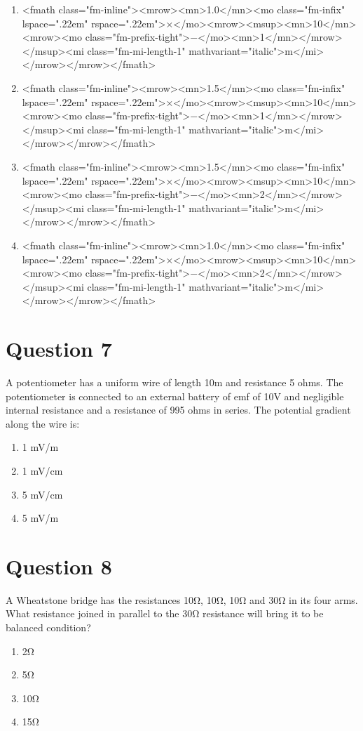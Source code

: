 \documentclass{article}
\begin{document}
\begin{enumerate}[label=(\alph*)]
\item  <fmath class="fm-inline"><mrow><mn>1.0</mn><mo class="fm-infix" lspace=".22em" rspace=".22em">×</mo><mrow><msup><mn>10</mn><mrow><mo class="fm-prefix-tight">−</mo><mn>1</mn></mrow></msup><mi class="fm-mi-length-1" mathvariant="italic">m</mi></mrow></mrow></fmath> 
\item  <fmath class="fm-inline"><mrow><mn>1.5</mn><mo class="fm-infix" lspace=".22em" rspace=".22em">×</mo><mrow><msup><mn>10</mn><mrow><mo class="fm-prefix-tight">−</mo><mn>1</mn></mrow></msup><mi class="fm-mi-length-1" mathvariant="italic">m</mi></mrow></mrow></fmath> 
\item  <fmath class="fm-inline"><mrow><mn>1.5</mn><mo class="fm-infix" lspace=".22em" rspace=".22em">×</mo><mrow><msup><mn>10</mn><mrow><mo class="fm-prefix-tight">−</mo><mn>2</mn></mrow></msup><mi class="fm-mi-length-1" mathvariant="italic">m</mi></mrow></mrow></fmath> 
\item  <fmath class="fm-inline"><mrow><mn>1.0</mn><mo class="fm-infix" lspace=".22em" rspace=".22em">×</mo><mrow><msup><mn>10</mn><mrow><mo class="fm-prefix-tight">−</mo><mn>2</mn></mrow></msup><mi class="fm-mi-length-1" mathvariant="italic">m</mi></mrow></mrow></fmath> 
\end{enumerate}
\newpage
\section*{Question 7}
A potentiometer has a uniform wire of length 10m and resistance 5 ohms. The potentiometer is connected to an external battery of emf of 10V and negligible internal resistance and a resistance of 995 ohms in series. The potential gradient along the wire is:
\begin{enumerate}[label=(\alph*)]
\item 1 mV/m
\item 1 mV/cm
\item 5 mV/cm
\item 5 mV/m
\end{enumerate}
\newpage
\section*{Question 8}
A Wheatstone bridge has the resistances 10Ω, 10Ω, 10Ω and 30Ω in its four arms. What resistance joined in parallel to the 30Ω resistance will bring it to be balanced condition?
\begin{enumerate}[label=(\alph*)]
\item 2Ω
\item 5Ω
\item 10Ω
\item 15Ω
\end{enumerate}
\newpage
\end{document}
